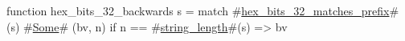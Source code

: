 function hex_bits_32_backwards s =
  match #\hyperref[sailRISCVzhexzybitszy32zymatcheszyprefix]{hex\_bits\_32\_matches\_prefix}#(s) {
      #\hyperref[sailRISCVzSome]{Some}# (bv, n) if n == #\hyperref[sailRISCVzstringzylength]{string\_length}#(s) => bv
  }
